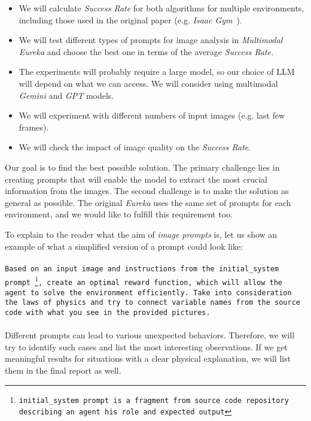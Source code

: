 \documentclass[10pt,twocolumn]{article}
\begin{document}
\begin{itemize}
    \item We will calculate \textit{Success Rate} for both algorithms for multiple environments, including those used in the original paper (e.g. \textit{Isaac Gym}~\cite{isaac_gym}).
    \item We will test different types of prompts for image analysis in \textit{Multimodal Eureka} and choose the best one in terms of the average \textit{Success Rate}.
    \item The experiments will probably require a large model, so our choice of LLM will depend on what we can access. We will consider using multimodal \textit{Gemini} and \textit{GPT} models.
    \item We will experiment with different numbers of input images (e.g. last few frames).
    \item We will check the impact of image quality on the \textit{Success Rate}.
\end{itemize}

Our goal is to find the best possible solution. The primary challenge lies in creating prompts that will enable the model to extract the most crucial information from the images. The second challenge is to make the solution as general as possible. The original \textit{Eureka} uses the same set of prompts for each environment, and we would like to fulfill this requirement too.

To explain to the reader what the aim of \textit{image prompts} is, let us show an example of what a simplified version of a prompt could look like:
\\\\
\texttt{Based on an input image and instructions from the initial\_system prompt~\footnote{initial\_system prompt is a fragment from source code repository~\cite{eureka_repo} describing an agent his role and expected output}, create an optimal reward function, which will allow the agent to solve the environment efficiently. Take into consideration the laws of physics and try to connect variable names from the source code with what you see in the provided pictures.}
\\\\
Different prompts can lead to various unexpected behaviors. Therefore, we will try to identify such cases and list the most interesting observations. If we get meaningful results for situations with a clear physical explanation, we will list them in the final report as well.
\end{document}
